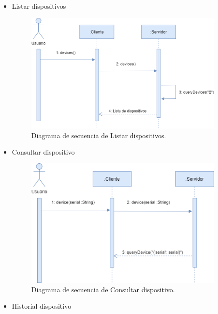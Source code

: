 \begin{itemize}
    \item Listar dispositivos     
    
    \vspace{5mm}

    \begin{figure}[h!]
        \centering
        \includegraphics[width=10cm]{imagenes/diagramas/diagrama_secuencia_dispositivos}
        \caption{Diagrama de secuencia de Listar dispositivos.}
        \label{fig:secuencia-de-listar-dispositivos}
    \end{figure}

    \newpage

    \item Consultar dispositivo     
    
    \vspace{5mm}

    \begin{figure}[h!]
        \centering
        \includegraphics[width=10cm]{imagenes/diagramas/diagrama_secuencia_dispositivo}
        \caption{Diagrama de secuencia de Consultar dispositivo.}
        \label{fig:secuencia-de-consultar-dispositivo}
    \end{figure}

    \item Historial dispositivo     
    

\end{itemize}
